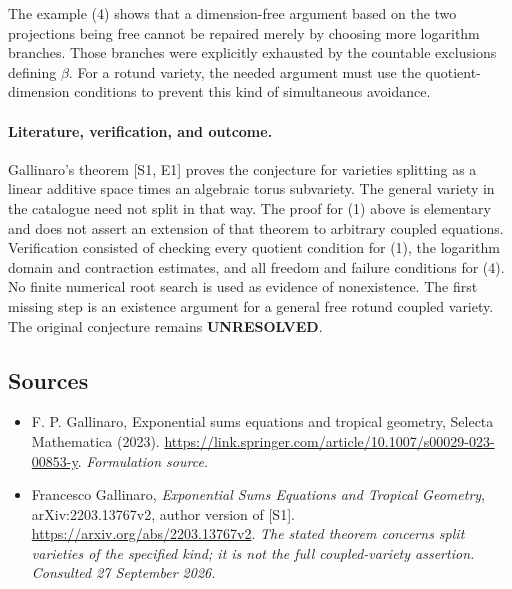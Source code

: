 \documentclass[11pt]{article}
\begin{document}
The example (4) shows that a dimension-free argument based on the two
projections being free cannot be repaired merely by choosing more
logarithm branches. Those branches were explicitly exhausted by the
countable exclusions defining $\beta$. For a rotund variety, the needed
argument must use the quotient-dimension conditions to prevent this
kind of simultaneous avoidance.

\paragraph{Literature, verification, and outcome.}
Gallinaro's theorem [S1, E1] proves the conjecture for varieties splitting
as a linear additive space times an algebraic torus subvariety. The
general variety in the catalogue need not split in that way. The proof
for (1) above is elementary and does not assert an extension of that
theorem to arbitrary coupled equations. Verification consisted of
checking every quotient condition for (1), the logarithm domain and
contraction estimates, and all freedom and failure conditions for (4).
No finite numerical root search is used as evidence of nonexistence.
The first missing step is an existence argument for a general free
rotund coupled variety. The original conjecture remains
\textbf{UNRESOLVED}.

\subsection{Sources}
\begin{itemize}
\item[S1]F. P. Gallinaro, Exponential sums equations and tropical geometry, Selecta Mathematica (2023).
\url{https://link.springer.com/article/10.1007/s00029-023-00853-y}.
\textit{Formulation source.}
\item[E1]Francesco Gallinaro, \emph{Exponential Sums Equations and
Tropical Geometry}, arXiv:2203.13767v2, author version of [S1].
\url{https://arxiv.org/abs/2203.13767v2}.
\textit{The stated theorem concerns split varieties of the specified
kind; it is not the full coupled-variety assertion. Consulted 27 September 2026.}

\end{itemize}
\end{document}
